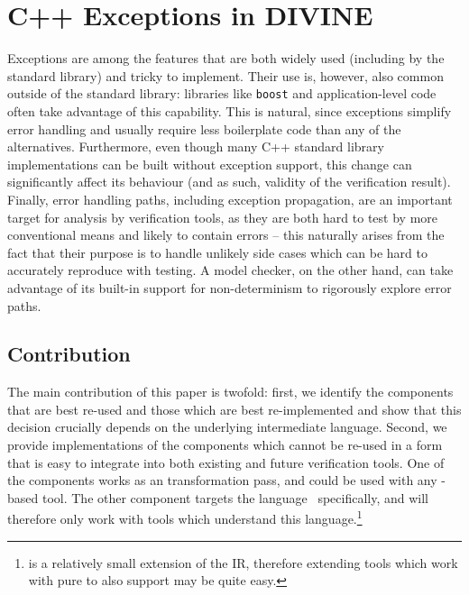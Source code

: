 \section{C++ Exceptions in DIVINE}\label{sec:lang:except}

Exceptions are among the features that are both widely used (including
by the standard library) and tricky to implement.
Their use is, however, also common outside of the standard library: libraries
like \texttt{boost} and application-level code often take advantage of this
capability.
This is natural, since exceptions simplify error handling and usually require
less boilerplate code than any of the alternatives.
Furthermore, even though many C++ standard library implementations can
be built without exception support, this change can significantly affect its behaviour
(and as such, validity of the verification result).
Finally, error handling paths, including exception propagation, are an
important target for analysis by verification tools, as they are both hard to
test by more conventional means and likely to contain errors -- this naturally
arises from the fact that their purpose is to handle unlikely side cases which
can be hard to accurately reproduce with testing.
A model checker, on the other hand, can take advantage of its built-in support
for non-determinism to rigorously explore error paths.

\subsection{Contribution}\label{contribution}

The main contribution of this paper is twofold: first, we identify the
components that are best re-used and those which are best re-implemented
and show that this decision crucially depends on the underlying
intermediate language. Second, we provide implementations of the
components which cannot be re-used in a form that is easy to integrate
into both existing and future verification tools. One of the components
works as an \llvm{} transformation pass, and could be used with any
\llvm{}-based tool. The other component targets the \divm{}
language~\cite{rockai17:divm} specifically, and will therefore only
work with tools which understand this language.\footnote{\divm{} is a
  relatively small extension of the \llvm{} IR, therefore extending tools
  which work with pure \llvm{} to also support \divm{} may be quite easy.}

